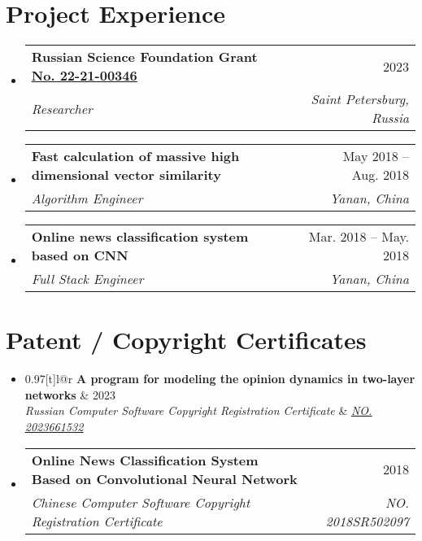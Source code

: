 \documentclass[letterpaper,10pt]{article}
\makeatletter
\newcommand{\link}[2]{\href{#1}{\color{blue}\underline{#2}}}
\newcommand{\resumeSubheading}[4]{
  \vspace{-2pt}\item
  \begin{tabular*}{0.97\textwidth}[t]{l@{\extracolsep{\fill}}r}
    \textbf{#1} & #2 \\
    \textit{\small#3} & \textit{\small #4} \\
  \end{tabular*}\vspace{-7pt}
}
\newenvironment{resumeSubHeadingList}{\begin{itemize}[leftmargin=0.15in, label={}]}{\end{itemize}}
\makeatother
\begin{document}
\section{Project Experience}
\begin{resumeSubHeadingList}
  \resumeSubheading
    {Russian Science Foundation Grant \link{https://rscf.ru/en/project/22-21-00346/}{No. 22-21-00346}}{2023}
       {Researcher}{Saint Petersburg, Russia} \resumeSubheading {Fast calculation of massive high dimensional vector
                    similarity}{May 2018 -- Aug. 2018} {Algorithm
                    Engineer}{Yanan, China}

  \resumeSubheading
    {Online news classification system based on CNN}{Mar. 2018 -- May. 2018}
    {Full Stack Engineer}{Yanan, China}

\end{resumeSubHeadingList}

\section{Patent / Copyright Certificates}
\begin{resumeSubHeadingList}
  \resumeSubheading
    {A program for modeling the opinion dynamics in two-layer networks}{2023}
    {Russian Computer Software Copyright Registration Certificate}{{\link{https://new.fips.ru/registers-doc-view/fips_servlet?DB=EVM&DocNumber=2023661532&TypeFile=html}{NO.
      2023661532}}}

  \resumeSubheading
    {Online News Classification System Based on Convolutional Neural Network}{2018}
    {Chinese Computer Software Copyright Registration Certificate}{NO. 2018SR502097}
\end{resumeSubHeadingList}
\end{document}
